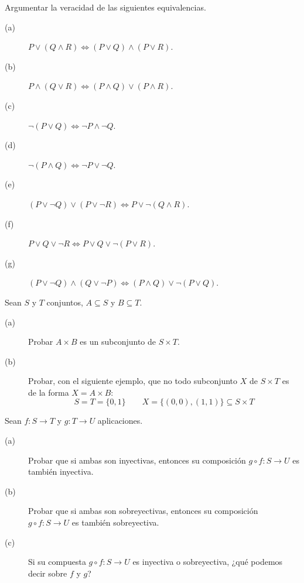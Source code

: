 \begin{ejercicio}
    Argumentar la veracidad de las siguientes equivalencias.
    \begin{description}
        \item [(a)] $P\lor(Q\land R) \Longleftrightarrow (P\lor Q)\land (P\lor R)$.
        \item [(b)] $P\land(Q\lor R) \Longleftrightarrow (P\land Q)\lor (P\land R)$.
        \item [(c)] $\neg(P\lor Q)\Longleftrightarrow \neg P \land \neg Q$.
        \item [(d)] $\neg(P\land Q)\Longleftrightarrow \neg P \lor \neg Q$.
        \item [(e)] $(P\lor \neg Q) \lor (P\lor \neg R) \Longleftrightarrow P\lor \neg (Q\land R)$.
        \item [(f)] $P\lor Q\lor \neg R \Longleftrightarrow P\lor Q\lor \neg (P\lor R)$.
        \item [(g)] $(P\lor \neg Q)\land(Q\lor \neg P)\Longleftrightarrow (P\land Q)\lor\neg(P\lor Q)$.
    \end{description}
\end{ejercicio}

\begin{ejercicio}
    Sean $S$ y $T$ conjuntos, $A\subseteq S$ y $B\subseteq T$.
    \begin{description}
        \item [(a)] Probar $A\times B$ es un subconjunto de $S\times T$.
        \item [(b)] Probar, con el siguiente ejemplo, que no todo subconjunto $X$ de $S\times T$ es de la forma $X=A\times B$:
            \begin{equation*}
                S = T = \{ 0,1 \} \qquad X = \{(0,0), (1,1)\} \subseteq S\times T
            \end{equation*}
    \end{description}
\end{ejercicio}

\begin{ejercicio}
    Sean $f:S\to T$ y $g:T\to U$ aplicaciones.
    \begin{description}
        \item [(a)] Probar que si ambas son inyectivas, entonces su composición $g\circ f:S\to U$ es también inyectiva.
        \item [(b)] Probar que si ambas son sobreyectivas, entonces su composición $g\circ f:S\to U$ es también sobreyectiva.
        \item [(c)] Si su compuesta $g\circ f:S\to U$ es inyectiva o sobreyectiva, ¿qué podemos decir sobre $f$ y $g$?
    \end{description}
\end{ejercicio}

